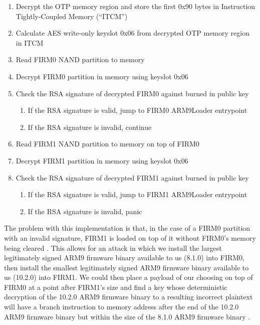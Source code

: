 \documentclass[journal]{IEEEtran}
\begin{document}
\medskip
\begin{enumerate}
  \item Decrypt the OTP memory region and store the first 0x90 bytes in
  Instruction Tightly-Coupled Memory (``ITCM'')\cite{OTP_Registers}
  \item Calculate AES write-only keyslot 0x06 from decrypted OTP memory region
  in ITCM
  \item Read FIRM0 NAND partition to memory
  \item Decrypt FIRM0 partition in memory using keyslot 0x06
  \item Check the RSA signature of decrypted FIRM0 against burned in public key
    \begin{enumerate}
    \item If the RSA signature is valid, jump to FIRM0 ARM9Loader entrypoint
    \item If the RSA signature is invalid, continue
    \end{enumerate}
  \item Read FIRM1 NAND partition to memory on top of FIRM0
  \item Decrypt FIRM1 partition in memory using keyslot 0x06
  \item Check the RSA signature of decrypted FIRM1 against burned in public key
    \begin{enumerate}
    \item If the RSA signature is valid, jump to FIRM1 ARM9Loader entrypoint
    \item If the RSA signature is invalid, panic
    \end{enumerate}
\end{enumerate}
\medskip

The problem with this implementation is that, in the case of a FIRM0 partition
with an invalid signature, FIRM1 is loaded on top of it without FIRM0's memory
being cleared \cite{32c3}. This allows for an attack in which we install the
largest legitimately signed ARM9 firmware binary available to us (8.1.0) into
FIRM0, then install the smallest legitimately signed ARM9 firmware binary
available to us (10.2.0) into FIRM1. We could then place a payload of our
choosing on top of FIRM0 at a point after FIRM1's size and find a key whose
deterministic decryption of the 10.2.0 ARM9 firmware binary to a resulting
incorrect plaintext will have a branch instruction to memory address after the
end of the 10.2.0 ARM9 firmware binary but within the size of the 8.1.0 ARM9
firmware binary \cite{32c3}.
\end{document}
